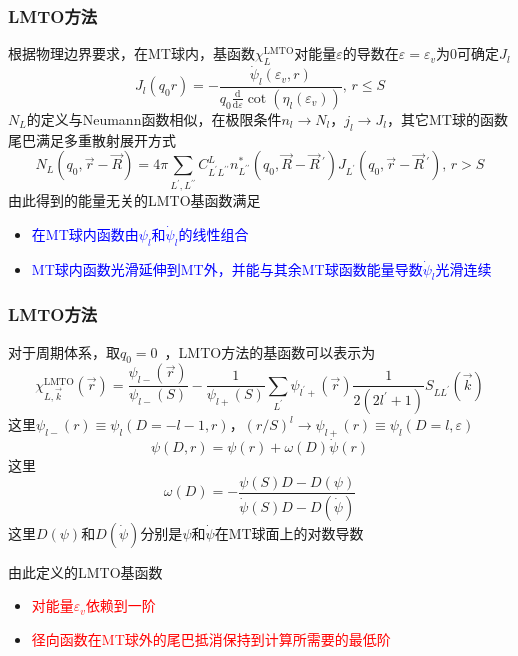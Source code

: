 \frame
{
	\frametitle{\textrm{LMTO}方法}
	根据物理边界要求，在\textrm{MT}球内，基函数$\chi_L^{\mathrm{LMTO}}$对能量$\varepsilon$的导数在$\varepsilon=\varepsilon_v$为0可确定$J_l$
		\begin{displaymath}
			J_l(q_0r)=-\dfrac{\dot{\psi}_l(\varepsilon_v,r)}{q_0\frac{\mathrm{d}}{\mathrm{d}\varepsilon}\cot(\eta_l(\varepsilon_v))},\,r\leqslant S
		\end{displaymath}
		$N_L$的定义与\textrm{Neumann}函数相似，在极限条件$n_l\rightarrow N_l$，$j_l\rightarrow J_l$，其它\textrm{MT}球的函数尾巴满足多重散射展开方式
		\begin{displaymath}
				N_L(q_0,\vec r-\vec R)=4\pi\sum_{L^{\prime},L^{\prime\prime}}C_{L^{\prime}L^{\prime\prime}}^Ln_{L^{\prime\prime}}^{\ast}(q_0,\vec R-\vec R\,^{\prime})J_{L^{\prime}}(q_0,\vec r-\vec R\,^{\prime}),\,r>S
		\end{displaymath}
		由此得到的能量无关的\textrm{LMTO}基函数满足
		\begin{itemize}
			\item \textcolor{blue}{在\textrm{MT}球内函数由$\psi_l$和$\dot{\psi}_l$的线性组合}
			\item \textcolor{blue}{\textrm{MT}球内函数光滑延伸到\textrm{MT}外，并能与其余\textrm{MT}球函数能量导数$\dot{\psi}_l$光滑连续}
		\end{itemize}
}

\frame
{
	\frametitle{\textrm{LMTO}方法}
	对于周期体系，取$q_0=0$~，\textrm{LMTO}方法的基函数可以表示为
	\begin{displaymath}
		\chi_{L,\vec k}^{\mathrm{LMTO}}(\vec r)=\dfrac{\psi_{l-}(\vec r)}{\psi_{l-}(S)}-\dfrac1{\psi_{l+}(S)}\sum_{L^{\prime}}\psi_{l^{\prime}+}(\vec r)\dfrac1{2(2l^{\prime}+1)}S_{LL^{\prime}}(\vec k)
	\end{displaymath}
	这里$\psi_{l-}(r)\equiv\psi_l(D=-l-1,r)$，$(r/S)^l\rightarrow\psi_{l+}(r)\equiv\psi_l(D=l,\varepsilon)$
	$$\psi(D,r)=\psi(r)+\omega(D)\dot\psi(r)$$
	这里
	$$\omega(D)=-\dfrac{\psi(S)D-D(\psi)}{\dot\psi(S)D-D(\dot\psi)}$$
	这里$D(\psi)$和$D(\dot\psi)$分别是$\psi$和$\dot\psi$在\textrm{MT}球面上的对数导数

	由此定义的\textrm{LMTO}基函数
	\begin{itemize}
		\item \textcolor{red}{对能量$\varepsilon_v$依赖到一阶}
		\item \textcolor{red}{径向函数在\textrm{MT}球外的尾巴抵消保持到计算所需要的最低阶}
	\end{itemize}
}

